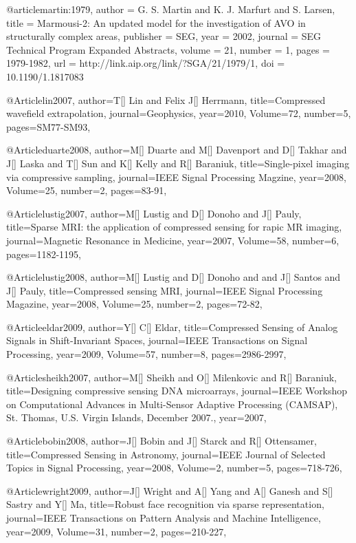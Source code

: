 {@article{martin:1979,
  author =	 {G. S. Martin and K. J. Marfurt and S. Larsen},
  title =	 {Marmousi-2: An updated model for the investigation
                  of AVO in structurally complex areas},
  publisher =	 {SEG},
  year =	 2002,
  journal =	 {SEG Technical Program Expanded Abstracts},
  volume =	 21,
  number =	 1,
  pages =	 {1979-1982},
  url =		 {http://link.aip.org/link/?SGA/21/1979/1},
  doi =		 {10.1190/1.1817083}
}

@Article{lin2007,
  author={T[] Lin and Felix J[] Herrmann},
  title={Compressed wavefield extrapolation},
  journal={Geophysics},
  year=2010,
  Volume=72,
  number=5,
  pages={SM77-SM93},
}

@Article{duarte2008,
  author={M[] Duarte and M[] Davenport and D[] Takhar and J[] Laska and T[] Sun and K[] Kelly and R[] Baraniuk},
  title={Single-pixel imaging via compressive sampling},
  journal={IEEE Signal Processing Magzine},
  year=2008,
  Volume=25,
  number=2,
  pages={83-91},
}

@Article{lustig2007,
  author={M[] Lustig and D[] Donoho and J[] Pauly},
  title={Sparse MRI: the application of compressed sensing for rapic MR imaging},
  journal={Magnetic Resonance in Medicine},
  year=2007,
  Volume=58,
  number=6,
  pages={1182-1195},
}

@Article{lustig2008,
  author={M[] Lustig and D[] Donoho and and J[] Santos and J[] Pauly},
  title={Compressed sensing MRI},
  journal={IEEE Signal Processing Magazine},
  year=2008,
  Volume=25,
  number=2,
  pages={72-82},
}

@Article{eldar2009,
  author={Y[] C[] Eldar},
  title={Compressed Sensing of Analog Signals in Shift-Invariant Spaces},
  journal={IEEE Transactions on Signal Processing},
  year=2009,
  Volume=57,
  number=8,
  pages={2986-2997},
}

@Article{sheikh2007,
  author={M[] Sheikh and O[] Milenkovic and R[] Baraniuk},
  title={Designing compressive sensing DNA microarrays},
  journal={IEEE Workshop on Computational Advances in Multi-Sensor Adaptive
Processing (CAMSAP), St. Thomas, U.S. Virgin Islands, December 2007.},
  year=2007,
}

@Article{bobin2008,
  author={J[] Bobin and J[] Starck and R[] Ottensamer},
  title={Compressed Sensing in Astronomy},
  journal={IEEE Journal of Selected Topics in Signal Processing},
  year=2008,
  Volume=2,
  number=5,
  pages={718-726},
}

@Article{wright2009,
  author={J[] Wright and A[] Yang and A[] Ganesh and S[] Sastry and Y[] Ma},
  title={Robust face recognition via sparse representation},
  journal={IEEE Transactions on Pattern Analysis and Machine Intelligence},
  year=2009,
  Volume=31,
  number=2,
  pages={210-227},
}

}
